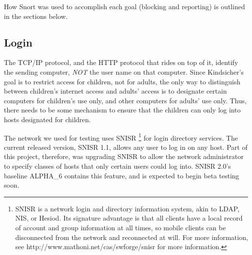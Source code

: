 How Snort was used to accomplish each goal (blocking and reporting) is outlined
in the sections below.

\subsection{Login}

The TCP/IP protocol, and the HTTP protocol that rides on top of it, identify
the sending computer, \emph{NOT} the user name on that computer.
%
Since Kindsicher's goal is to restrict access for children, not for adults,
the only way to distinguish between children's internet access and adults'
access is to designate certain computers for children's use only, and other
computers for adults' use only.
%
Thus, there needs to be some mechanism to ensure that the children can only
log into hosts designated for children.

The network we used for testing uses SNISR
%
\footnote{ SNISR is a network login and directory information system, akin to
LDAP, NIS, or Hesiod.  Its signature advantage is that all clients have a
local record of account and group information at all times, so mobile clients
can be disconnected from the network and reconnected at will.  For more
information, see http://www.mathoni.net/cas/swforge/snisr for more
information. }
%
for login directory services.
%
The current released version, SNISR 1.1, allows any user to log in on any host.
%
Part of this project, therefore, was upgrading SNISR to allow the network
administrator to specify classes of hosts that only certain users could log
into.
%
SNISR 2.0's baseline ALPHA\_6 contains this feature, and is expected to begin
beta testing soon.


